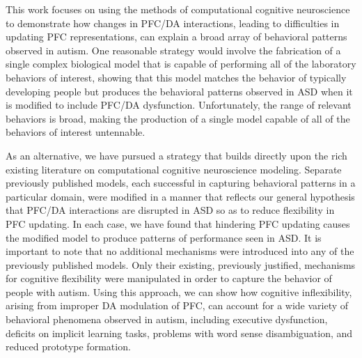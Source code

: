 %
% 

This work focuses on using the methods of computational cognitive neuroscience to demonstrate how changes in PFC/DA interactions, leading to difficulties in updating PFC representations, can explain a broad array of behavioral patterns observed in autism. One reasonable strategy would involve the fabrication of a single complex biological model that is capable of performing all of the laboratory behaviors of interest, showing that this model matches the behavior of typically developing people but produces the behavioral patterns observed in ASD when it is modified to include PFC/DA dysfunction. Unfortunately, the range of relevant behaviors is broad, making the production of a single model capable of all of the behaviors of interest untennable.

As an alternative, we have pursued a strategy that builds directly upon the rich existing literature on computational cognitive neuroscience modeling. Separate previously published models, each successful in capturing behavioral patterns in a particular domain, were modified in a manner that reflects our general hypothesis that PFC/DA interactions are disrupted in ASD so as to reduce flexibility in PFC updating. In each case, we have found that hindering PFC updating causes the modified model to produce patterns of performance seen in ASD. It is important to note that no additional mechanisms were introduced into any of the previously published models. Only their existing, previously justified, mechanisms for cognitive flexibility were manipulated in order to capture the behavior of people with autism. Using this approach, we can show how cognitive inflexibility, arising from improper DA modulation of PFC, can account for a wide variety of behavioral phenomena observed in autism, including executive dysfunction, deficits on implicit learning tasks, problems with word sense disambiguation, and reduced prototype formation.

